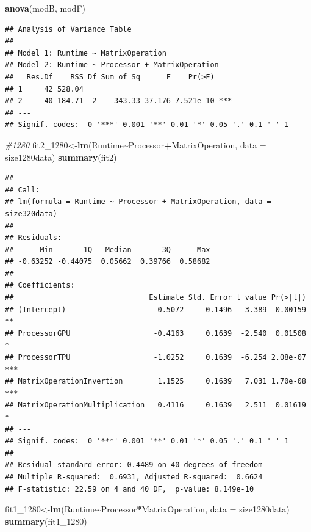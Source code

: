 \documentclass[
]{article}
\newenvironment{Shaded}{\begin{snugshade}}{\end{snugshade}}
\newcommand{\CommentTok}[1]{\textcolor[rgb]{0.56,0.35,0.01}{\textit{#1}}}
\newcommand{\DataTypeTok}[1]{\textcolor[rgb]{0.13,0.29,0.53}{#1}}
\newcommand{\DecValTok}[1]{\textcolor[rgb]{0.00,0.00,0.81}{#1}}
\newcommand{\KeywordTok}[1]{\textcolor[rgb]{0.13,0.29,0.53}{\textbf{#1}}}
\newcommand{\NormalTok}[1]{#1}
\newcommand{\OperatorTok}[1]{\textcolor[rgb]{0.81,0.36,0.00}{\textbf{#1}}}
\begin{document}
\begin{Shaded}
\begin{Highlighting}[]
\KeywordTok{anova}\NormalTok{(modB, modF)}
\end{Highlighting}
\end{Shaded}

\begin{verbatim}
## Analysis of Variance Table
## 
## Model 1: Runtime ~ MatrixOperation
## Model 2: Runtime ~ Processor + MatrixOperation
##   Res.Df    RSS Df Sum of Sq      F    Pr(>F)    
## 1     42 528.04                                  
## 2     40 184.71  2    343.33 37.176 7.521e-10 ***
## ---
## Signif. codes:  0 '***' 0.001 '**' 0.01 '*' 0.05 '.' 0.1 ' ' 1
\end{verbatim}

\begin{Shaded}
\begin{Highlighting}[]
\CommentTok{\#1280}
\NormalTok{fit2\_}\DecValTok{1280}\NormalTok{\textless{}{-}}\KeywordTok{lm}\NormalTok{(Runtime}\OperatorTok{\textasciitilde{}}\NormalTok{Processor}\OperatorTok{+}\NormalTok{MatrixOperation, }\DataTypeTok{data =}\NormalTok{ size1280data)}
\KeywordTok{summary}\NormalTok{(fit2)}
\end{Highlighting}
\end{Shaded}

\begin{verbatim}
## 
## Call:
## lm(formula = Runtime ~ Processor + MatrixOperation, data = size320data)
## 
## Residuals:
##      Min       1Q   Median       3Q      Max 
## -0.63252 -0.44075  0.05662  0.39766  0.58682 
## 
## Coefficients:
##                               Estimate Std. Error t value Pr(>|t|)    
## (Intercept)                     0.5072     0.1496   3.389  0.00159 ** 
## ProcessorGPU                   -0.4163     0.1639  -2.540  0.01508 *  
## ProcessorTPU                   -1.0252     0.1639  -6.254 2.08e-07 ***
## MatrixOperationInvertion        1.1525     0.1639   7.031 1.70e-08 ***
## MatrixOperationMultiplication   0.4116     0.1639   2.511  0.01619 *  
## ---
## Signif. codes:  0 '***' 0.001 '**' 0.01 '*' 0.05 '.' 0.1 ' ' 1
## 
## Residual standard error: 0.4489 on 40 degrees of freedom
## Multiple R-squared:  0.6931, Adjusted R-squared:  0.6624 
## F-statistic: 22.59 on 4 and 40 DF,  p-value: 8.149e-10
\end{verbatim}

\begin{Shaded}
\begin{Highlighting}[]
\NormalTok{fit1\_}\DecValTok{1280}\NormalTok{\textless{}{-}}\KeywordTok{lm}\NormalTok{(Runtime}\OperatorTok{\textasciitilde{}}\NormalTok{Processor}\OperatorTok{*}\NormalTok{MatrixOperation, }\DataTypeTok{data =}\NormalTok{ size1280data)}
\KeywordTok{summary}\NormalTok{(fit1\_}\DecValTok{1280}\NormalTok{)}
\end{Highlighting}
\end{Shaded}
\end{document}
